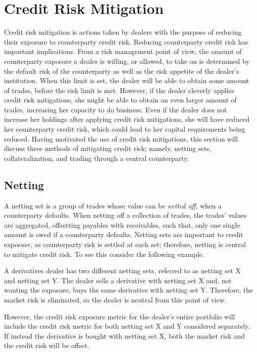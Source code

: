 \documentclass[main.tex]{subfiles}
\begin{document}
    \section{Credit Risk Mitigation}
    
    Credit risk mitigation is actions taken by dealers 
    with the purpose of reducing their exposure to counterparty credit risk.
    Reducing counterparty credit risk has important implications.
    From a risk management point of view,
    the amount of counterparty exposure a dealer is willing, or allowed, to take on 
    is determined by the default risk of the counterparty 
    as well as the risk appetite of the dealer's institution.
    When this limit is set, the dealer will be able to obtain some amount of trades,
    before the risk limit is met.
    However, if the dealer cleverly applies credit risk mitigations,
    she might be able to obtain an even larger amount of trades,
    increasing her capacity to do business.
    Even if the dealer does not increase her holdings after applying credit risk mitigations,
    she will have reduced her counterparty credit risk,
    which could lead to her capital requirements being reduced.
    Having motivated the use of credit risk mitigations,
    this section will discuss three methods of mitigating credit risk;
    namely, netting sets, collateralization, and trading through a central counterparty.

    \subsection{Netting}
        A netting set is a group of trades whose value can be \textit{netted off}, 
        when a counterparty defaults.
        When netting off a collection of trades, the trades' values are aggregated,
        offsetting payables with receivables, such that,
        only one single amount is owed if a counterparty defaults.
        Netting sets are important to credit exposure, 
        as counterparty risk is settled at each set;
        therefore, netting is central to mitigate credit risk.
        To see this consider the following example.

        \begin{example}    
        A derivatives dealer has two different netting sets, 
        referred to as netting set X and netting set Y.
        The dealer sells a derivative with netting set X and, 
        not wanting the exposure, buys the same derivative with netting set Y.
        Therefore, the market risk is eliminated, so the dealer is neutral from this point of view.

        However, the credit risk exposure metric for the dealer's entire portfolio will include 
        the credit risk metric for both netting set X and Y considered separately.
        If instead the derivative is bought with netting set X,
        both the market risk and the credit risk will be offset.
        \end{example}
\end{document}
